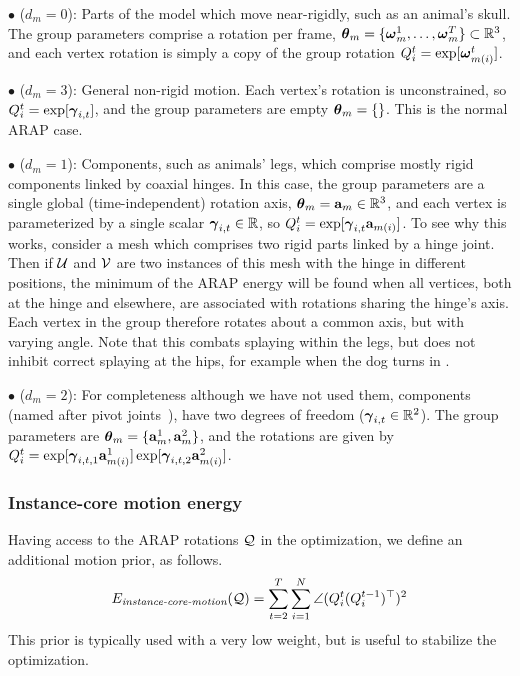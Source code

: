 \documentclass[preprint]{acmsiggraph}
\begin{document}
$\bullet$  ($d_m=0$): Parts of the model which move near-rigidly, such as an animal's skull.  The group parameters comprise a rotation per frame, $\boldsymbol\theta_m = \{\mbox{\boldmath$\omega$}^1_m, \ldots, \mbox{\boldmath$\omega$}^T_m\} \subset \mathbb R^3$, and each vertex rotation is simply a copy of the group rotation $Q_i^t = \exp[\mbox{\boldmath$\omega$}^t_{m(i)}]$.

$\bullet$  ($d_m=3$): General non-rigid motion. Each vertex's rotation is unconstrained, so $Q_i^t = \exp[\boldsymbol\gamma_{{i,t}}]$, and the group parameters are empty $\boldsymbol\theta_m = \{\}$. This is the normal ARAP case.

$\bullet$  ($d_m=1$): Components, such as animals' legs, which comprise mostly rigid components linked by coaxial hinges.  In this case, the group parameters are a single global (time-independent) rotation axis, $\boldsymbol\theta_m = \mathbf{a}_m \in \mathbb R^3$, and each vertex is parameterized by a single scalar $\boldsymbol\gamma_{{i,t}} \in \mathbb R$, so $Q_i^t = \exp[\boldsymbol\gamma_{{i,t}}\mathbf{a}_{m(i)}]$.
To see why this works, consider a mesh which comprises two rigid parts linked by a hinge joint.  Then if $\mathcal{U}$ and $\mathcal{V}$ are two instances of this mesh with the hinge in different positions, the minimum of the ARAP energy will be found when all vertices, both at the hinge and elsewhere, are associated with rotations sharing the hinge's axis.   
Each vertex in the group therefore rotates about a common axis, but with varying angle.  Note that this combats splaying within the legs, but does not inhibit correct splaying at the hips, for example when the dog turns in .

$\bullet$  ($d_m=2$): 
For completeness although we have not used them,  components (named after pivot joints~\cite[page 64]{Grassia00}), have two degrees of freedom ($\boldsymbol\gamma_{{i,t}} \in \mathbb R^2$).  The group parameters are $\boldsymbol\theta_m = \{\mathbf{a}_m^1, \mathbf{a}_m^2\}$, and the rotations are given by $Q_i^t = \exp[\boldsymbol\gamma_{{i,t,1}}\mathbf{a}^1_{m(i)}]\exp[\boldsymbol\gamma_{{i,t,2}}\mathbf{a}^2_{m(i)}]$.


\subsubsection{Instance-core motion energy}
Having access to the ARAP rotations $\mathcal{Q}$ in the optimization, we define an additional motion prior, as follows.
\begin{equation}
E_{\text{\em instance-core-motion}}(\mathcal{Q}) = \sum_{t=2}^T \sum_{i=1}^N \angle( Q_i^t (Q_i^{t-1})^\top ) ^2
\label{eq:Einscormotion}
\end{equation}
This prior is typically used with a very low weight, but is useful to stabilize the optimization.
\end{document}

